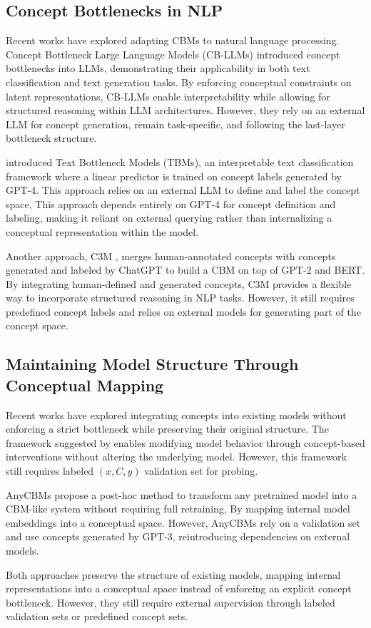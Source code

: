 \subsection{Concept Bottlenecks in NLP}

Recent works have explored adapting CBMs to natural language processing. Concept Bottleneck Large Language Models (CB-LLMs) \citet{sun2024conceptbottlenecklargelanguage} introduced concept bottlenecks into LLMs, demonstrating their applicability in both text classification and text generation tasks. By enforcing conceptual constraints on latent representations, CB-LLMs enable interpretability while allowing for structured reasoning within LLM architectures. However, they rely on an external LLM for concept generation, remain task-specific, and following the last-layer bottleneck structure.

\citet{ludan2024interpretablebydesigntextunderstandingiteratively} introduced Text Bottleneck Models (TBMs), an interpretable text classification framework where a linear predictor is trained on concept labels generated by GPT-4. This approach relies on an external LLM to define and label the concept space, This approach depends entirely on GPT-4 for concept definition and labeling, making it reliant on external querying rather than internalizing a conceptual representation within the model.

Another approach, C3M \cite{tan2023interpretingpretrainedlanguagemodels}, merges human-annotated concepts with concepts generated and labeled by ChatGPT to build a CBM on top of GPT-2 and BERT. By integrating human-defined and generated concepts, C3M provides a flexible way to incorporate structured reasoning in NLP tasks. However, it still requires predefined concept labels and relies on external models for generating part of the concept space.

\subsection{Maintaining Model Structure Through Conceptual Mapping}

Recent works have explored integrating concepts into existing models without enforcing a strict bottleneck while preserving their original structure. The framework suggested by \citet{laguna2024conceptbottleneckmodelsmake} enables modifying model behavior through concept-based interventions without altering the underlying model. However, this framework still requires labeled $(x, C, y)$ validation set for probing.


AnyCBMs \citep{dominici2024anycbmsturnblackbox} propose a post-hoc method to transform any pretrained model into a CBM-like system without requiring full retraining, By mapping internal model embeddings into a conceptual space. However, AnyCBMs rely on a validation set and use concepts generated by GPT-3, reintroducing dependencies on external models.

Both approaches preserve the structure of existing models, mapping internal representations into a conceptual space instead of enforcing an explicit concept bottleneck. However, they still require external supervision through labeled validation sets or predefined concept sets.